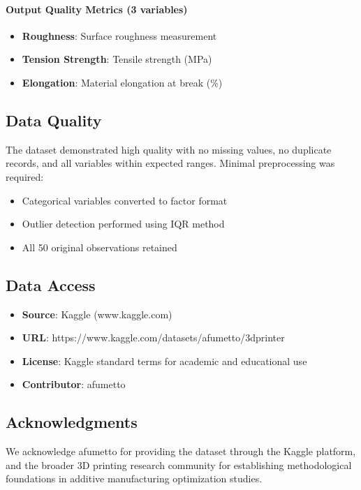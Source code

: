 \paragraph{Output Quality Metrics (3 variables)}
\begin{itemize}
    \item \textbf{Roughness}: Surface roughness measurement
    \item \textbf{Tension Strength}: Tensile strength (MPa)
    \item \textbf{Elongation}: Material elongation at break (\%)
\end{itemize}

\subsection{Data Quality}

The dataset demonstrated high quality with no missing values, no duplicate records, and all variables within expected ranges. Minimal preprocessing was required:
\begin{itemize}
    \item Categorical variables converted to factor format
    \item Outlier detection performed using IQR method
    \item All 50 original observations retained
\end{itemize}

\subsection{Data Access}

\begin{itemize}
    \item \textbf{Source}: Kaggle (www.kaggle.com)
    \item \textbf{URL}: https://www.kaggle.com/datasets/afumetto/3dprinter
    \item \textbf{License}: Kaggle standard terms for academic and educational use
    \item \textbf{Contributor}: afumetto
\end{itemize}

\subsection{Acknowledgments}

We acknowledge afumetto for providing the dataset through the Kaggle platform, and the broader 3D printing research community for establishing methodological foundations in additive manufacturing optimization studies.
